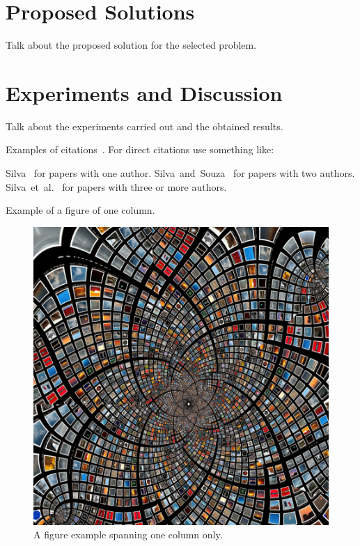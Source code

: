 \documentclass[10pt,twocolumn,letterpaper]{article}
\newcommand{\CITEONE}[2]{\mbox{#1 \cite{#2}}}
\newcommand{\CITETWO}[3]{\mbox{#1 and #2 \cite{#3}}}
\newcommand{\CITEN}[2]{\mbox{#1 et al. \cite{#2}}}
\begin{document}
\section{Proposed Solutions}
Talk about the proposed solution for the selected problem.

\section{Experiments and Discussion}
Talk about the experiments carried out and the obtained results.

Examples of citations~\cite{Ni_2008, Ni_2009}. For direct citations use something like:

\CITEONE{Silva}{Silva_2010} for papers with one author.
\CITETWO{Silva}{Souza}{Silva_2010b} for papers with two authors.
\CITEN{Silva}{Silva_2010c} for papers with three or more authors.

Example of a figure of one column.
\begin{figure}
\begin{center}
	\includegraphics[width=0.99\columnwidth]{pics/example-figure}
	\caption{A figure example spanning one column only.\label{fig:label}}
\end{center}
\end{figure}
\end{document}

